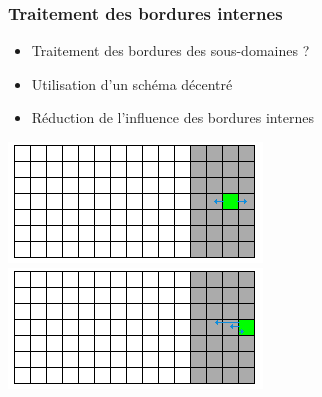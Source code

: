\documentclass{beamer}
\begin{document}
\begin{frame}
  \frametitle{Traitement des bordures internes}
  \begin{itemize}
  \item   Traitement des bordures des sous-domaines ?
  \item   Utilisation d'un schéma décentré 
  \item   Réduction de l'influence des bordures internes
  \end{itemize}
  \vspace{1cm}
  \centering
  \includegraphics[scale=0.4]{slide_border_1.png}\hspace{2.5cm}
  \includegraphics[scale=0.4]{slide_border_2.png}
  
\end{frame}

\end{document}
